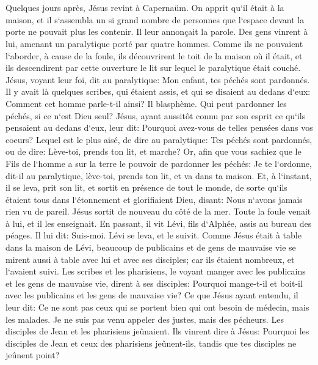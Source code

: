 \chapter{}

\verse Quelques jours après, Jésus revint à Capernaüm. On apprit qu`il était à la maison, 
\verse et il s`assembla un si grand nombre de personnes que l`espace devant la porte ne pouvait plus les contenir. Il leur annonçait la parole. 
\verse Des gens vinrent à lui, amenant un paralytique porté par quatre hommes. 
\verse Comme ils ne pouvaient l`aborder, à cause de la foule, ils découvrirent le toit de la maison où il était, et ils descendirent par cette ouverture le lit sur lequel le paralytique était couché. 
\verse Jésus, voyant leur foi, dit au paralytique: Mon enfant, tes péchés sont pardonnés. 
\verse Il y avait là quelques scribes, qui étaient assis, et qui se disaient au dedans d`eux: 
\verse Comment cet homme parle-t-il ainsi? Il blasphème. Qui peut pardonner les péchés, si ce n`est Dieu seul? 
\verse Jésus, ayant aussitôt connu par son esprit ce qu`ils pensaient au dedans d`eux, leur dit: Pourquoi avez-vous de telles pensées dans vos coeurs? 
\verse Lequel est le plus aisé, de dire au paralytique: Tes péchés sont pardonnés, ou de dire: Lève-toi, prends ton lit, et marche? 
\verse Or, afin que vous sachiez que le Fils de l`homme a sur la terre le pouvoir de pardonner les péchés: 
\verse Je te l`ordonne, dit-il au paralytique, lève-toi, prends ton lit, et va dans ta maison. 
\verse Et, à l`instant, il se leva, prit son lit, et sortit en présence de tout le monde, de sorte qu`ils étaient tous dans l`étonnement et glorifiaient Dieu, disant: Nous n`avons jamais rien vu de pareil. 
\verse Jésus sortit de nouveau du côté de la mer. Toute la foule venait à lui, et il les enseignait. 
\verse En passant, il vit Lévi, fils d`Alphée, assis au bureau des péages. Il lui dit: Suis-moi. Lévi se leva, et le suivit. 
\verse Comme Jésus était à table dans la maison de Lévi, beaucoup de publicains et de gens de mauvaise vie se mirent aussi à table avec lui et avec ses disciples; car ils étaient nombreux, et l`avaient suivi. 
\verse Les scribes et les pharisiens, le voyant manger avec les publicains et les gens de mauvaise vie, dirent à ses disciples: Pourquoi mange-t-il et boit-il avec les publicains et les gens de mauvaise vie? 
\verse Ce que Jésus ayant entendu, il leur dit: Ce ne sont pas ceux qui se portent bien qui ont besoin de médecin, mais les malades. Je ne suis pas venu appeler des justes, mais des pécheurs. 
\verse Les disciples de Jean et les pharisiens jeûnaient. Ils vinrent dire à Jésus: Pourquoi les disciples de Jean et ceux des pharisiens jeûnent-ils, tandis que tes disciples ne jeûnent point? 
